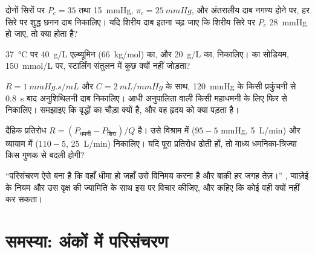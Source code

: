 \begin{exercise}[$\star\star$]\label{exo:b2:blood-circulation:8}
दोनों सिरों पर $P_c = 35$ तथा \qty{15}{mmHg}, $\pi_c =
\qty{25}{mmHg}$, और अंतरालीय दाब नगण्य होने पर, हर सिरे पर शुद्ध
छनन दाब निकालिए। यदि शिरीय दाब इतना चढ़ जाए कि शिरीय सिरे पर
$P_c$ \qty{28}{mmHg} हो जाए, तो क्या होता है?
\end{exercise}

\begin{exercise}[$\star\star$]\label{exo:b2:blood-circulation:9}
\qty{37}{\celsius} पर \qty{40}{g/L} एल्ब्यूमिन (\qty{66}{kg/mol})
का, और \qty{20}{g/L} का,  निकालिए।  का
सोडियम, \qty{150}{mmol/L} पर, स्टार्लिंग संतुलन में कुछ क्यों नहीं
जोड़ता?
\end{exercise}

\begin{exercise}[$\star\star\star$]\label{exo:b2:blood-circulation:10}
$R = \qty{1}{mmHg.s/mL}$ और $C = \qty{2}{mL/mmHg}$ के साथ,
\qty{120}{mmHg} के किसी प्रकुंचनी से \qty{0.8}{s} बाद अनुशिथिलनी दाब
निकालिए। आधी अनुपालिता वाली किसी महाधमनी के लिए फिर से निकालिए। समझाइए कि
वृद्धों का  चौड़ा क्यों है, और वह हृदय को क्या
पड़ता है।
\end{exercise}

\begin{exercise}[$\star\star\star$]\label{exo:b2:blood-circulation:11}
दैहिक प्रतिरोध $R = (P_{\text{धमनी}} - P_{\text{शिरा}})/Q$ है।
उसे विश्राम में ($95 - 5$ mmHg, \qty{5}{L/min}) और व्यायाम में
($110 - 5$, \qty{25}{L/min}) निकालिए। यदि  पूरा प्रतिरोध ढोती
हों, तो माध्य धमनिका-त्रिज्या किस गुणक से बदली होगी?
\end{exercise}

\begin{exercise}[$\star\star\star$]\label{exo:b2:blood-circulation:12}
``परिसंचरण ऐसे बना है कि  वहाँ धीमा हो जहाँ उसे
विनिमय करना है और बाक़ी हर जगह तेज़।'' , प्वाज़ेई के नियम और उस वृक्ष की ज्यामिति के साथ इस पर विचार कीजिए, और कहिए
कि कोई  वही क्यों नहीं कर सकता।
\end{exercise}

\section{समस्या: अंकों में परिसंचरण}

